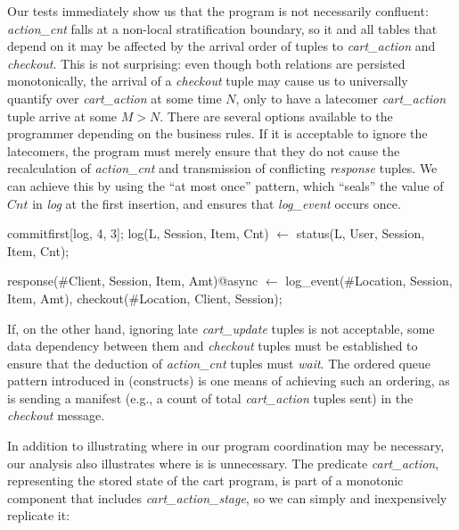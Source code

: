 

Our tests immediately show us that the program is not necessarily confluent: 
{\em action\_cnt} falls at a non-local stratification boundary, so it and all tables that
depend on it may be affected by the arrival order of tuples to {\em cart\_action} and
{\em checkout}.  This is not surprising: even though both relations are persisted monotonically,
the arrival of a {\em checkout} tuple may cause us to universally quantify over {\em cart\_action}
at some time $N$, only to have a latecomer {\em cart\_action} tuple arrive at some $M > N$.
There are several options available to the programmer depending on the business rules.
If it is acceptable to ignore the latecomers, the program must merely ensure that they do not 
cause the recalculation of {\em action\_cnt} and transmission of conflicting {\em response} 
tuples.  We can achieve this by using the ``at most once'' pattern, which ``seals'' the value
of $Cnt$ in {\em log} at the first insertion, and ensures that {\em log\_event} occurs once.
\begin{Dedalus}
commitfirst[log, 4, 3];
log(L, Session, Item, Cnt) \(\leftarrow\) 
    status(L, User, Session, Item, Cnt);

response(#Client, Session, Item, Amt)@async \(\leftarrow\)
    log_event(#Location, Session, Item, Amt),
    checkout(#Location, Client, Session);
\end{Dedalus}


If, on the other hand, ignoring late {\em  cart\_update} tuples is not acceptable,
some data dependency between them and {\em checkout} tuples must be established
to ensure that the deduction of {\em action\_cnt} tuples must {\em wait}.  
The ordered queue pattern introduced in (constructs) is one means of achieving such an 
ordering, as is sending a manifest (e.g., a count of total {\em cart\_action} tuples
sent) in the {\em checkout} message.




In addition to illustrating where in our program coordination may be necessary, our
analysis also illustrates where is is unnecessary.
The predicate {\em cart\_action}, representing the stored state 
of the cart program,  is part of a monotonic component that includes {\em cart\_action\_stage}, 
so we can simply and inexpensively replicate it:


